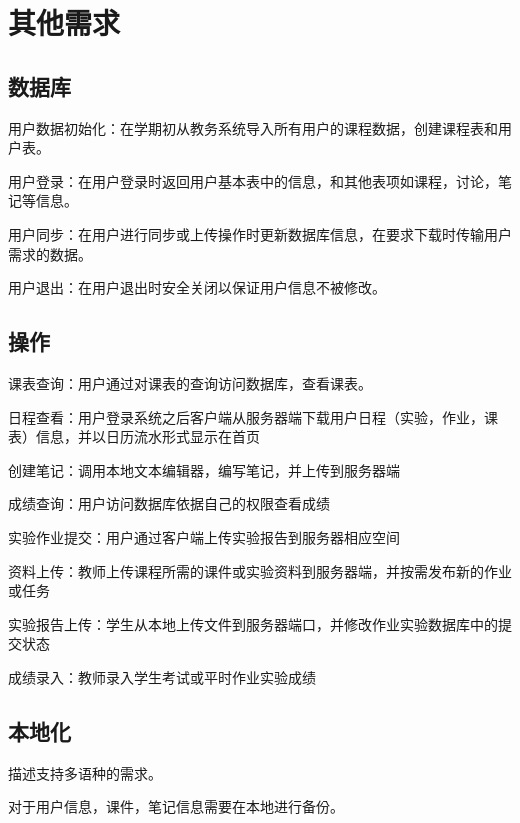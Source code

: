 \chapter{其他需求}

\section{数据库}

用户数据初始化：在学期初从教务系统导入所有用户的课程数据，创建课程表和用户表。

用户登录：在用户登录时返回用户基本表中的信息，和其他表项如课程，讨论，笔记等信息。

用户同步：在用户进行同步或上传操作时更新数据库信息，在要求下载时传输用户需求的数据。

用户退出：在用户退出时安全关闭以保证用户信息不被修改。


\section{操作}

课表查询：用户通过对课表的查询访问数据库，查看课表。

日程查看：用户登录系统之后客户端从服务器端下载用户日程（实验，作业，课表）信息，并以日历流水形式显示在首页

创建笔记：调用本地文本编辑器，编写笔记，并上传到服务器端

成绩查询：用户访问数据库依据自己的权限查看成绩

实验作业提交：用户通过客户端上传实验报告到服务器相应空间

资料上传：教师上传课程所需的课件或实验资料到服务器端，并按需发布新的作业或任务

实验报告上传：学生从本地上传文件到服务器端口，并修改作业实验数据库中的提交状态

成绩录入：教师录入学生考试或平时作业实验成绩


\section{本地化}

描述支持多语种的需求。

对于用户信息，课件，笔记信息需要在本地进行备份。
